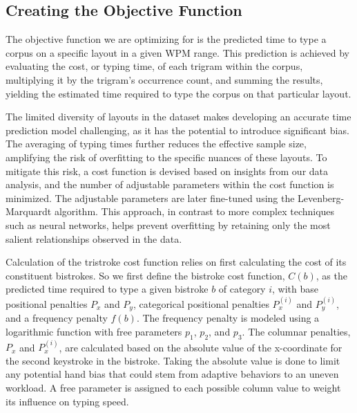 \subsection{Creating the Objective Function}
The objective function we are optimizing for is the predicted time to type a corpus on a specific layout in a given WPM range. This prediction is achieved by evaluating the cost, or typing time, of each trigram within the corpus, multiplying it by the trigram's occurrence count, and summing the results, yielding the estimated time required to type the corpus on that particular layout.

The limited diversity of layouts in the dataset makes developing an accurate time prediction model challenging, as it has the potential to introduce significant bias. The averaging of typing times further reduces the effective sample size, amplifying the risk of overfitting to the specific nuances of these layouts. To mitigate this risk, a cost function is devised based on insights from our data analysis, and the number of adjustable parameters within the cost function is minimized. The adjustable parameters are later fine-tuned using the Levenberg-Marquardt algorithm. This approach, in contrast to more complex techniques such as neural networks, helps prevent overfitting by retaining only the most salient relationships observed in the data. 



Calculation of the tristroke cost function relies on first calculating the cost of its constituent bistrokes. So we first define the bistroke cost function, $C(b)$, as the predicted time required to type a given bistroke $b$ of category $i$, with base positional penalties $P_x$ and $P_y$, categorical positional penalties $P^{(i)}_x$ and $P^{(i)}_y$, and a frequency penalty $f(b)$. The frequency penalty is modeled using a logarithmic function with free parameters $p_1$, $p_2$, and $p_3$. The columnar penalties, $P_x$ and $P^{(i)}_x$, are calculated based on the absolute value of the x-coordinate for the second keystroke in the bistroke. Taking the absolute value is done to limit any potential hand bias that could stem from adaptive behaviors to an uneven workload. A free parameter is assigned to each possible column value to weight its influence on typing speed. %


